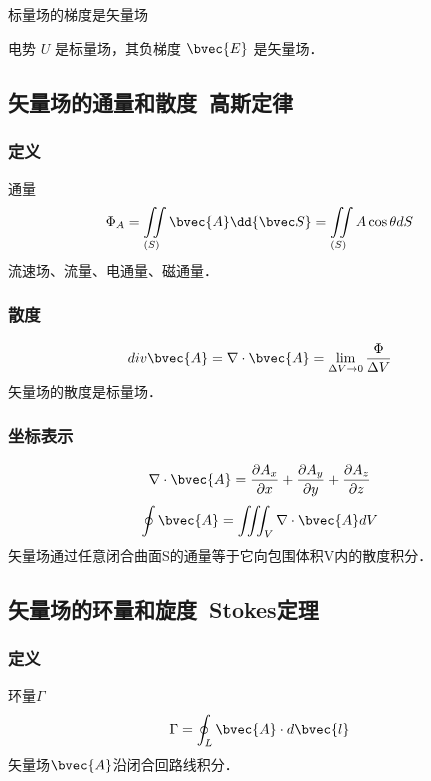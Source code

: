 标量场的梯度是矢量场

电势 $U$ 是标量场，其负梯度 $\bvec{E}$ 是矢量场．

\subsection{矢量场的通量和散度\ 高斯定律}%
\subsubsection{定义}
通量
\begin{equation}\label{VecAnl_eq6}
\Phi_A=\iint\limits_{(S)} \bvec{A} \dd{\bvec S} = \iint\limits_{(S)} A\cos\theta dS
\end{equation}
流速场、流量、电通量、磁通量．

\subsubsection{散度}
\begin{equation}\label{VecAnl_eq7}
div \bvec{A}=\nabla \cdot \bvec{A}=\lim_{\Delta V \to 0}\frac{\Phi}{\Delta V}
\end{equation}
矢量场的散度是标量场．

\subsubsection{坐标表示}
\begin{equation}\label{VecAnl_eq8}
\nabla \cdot \bvec{A}= \frac{\partial A_x}{\partial x}+\frac{\partial A_y}{\partial y}+\frac{\partial A_z}{\partial z}
\end{equation}
\begin{equation}\label{VecAnl_eq9}
\oint \bvec{A}=\iiint_V \nabla \cdot \bvec{A} dV
\end{equation}
矢量场通过任意闭合曲面S的通量等于它向包围体积V内的散度积分．
\subsection{矢量场的环量和旋度\ Stokes定理}%

\subsubsection{定义}
环量$\Gamma$
\begin{equation}\label{VecAnl_eq10}
\Gamma=\oint_L \bvec{A} \cdot d \bvec{l}
\end{equation}
矢量场$\bvec{A}$沿闭合回路线积分．

